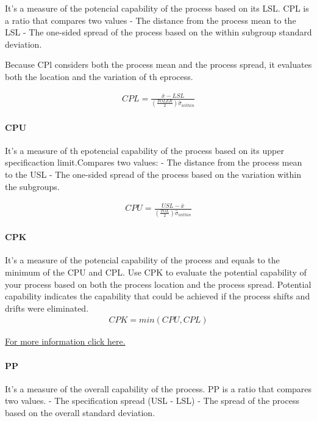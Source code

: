 \documentclass[11pt]{article}
\begin{document}
It's a measure of the potencial capability of the process based on its
LSL. CPL is a ratio that compares two values - The distance from the
process mean to the LSL - The one-sided spread of the process based on
the within subgroup standard deviation.

Because CPl considers both the process mean and the process spread, it
evaluates both the location and the variation of th eprocess.

\begin{gather}
  CPL = \frac{\bar{x} - LSL}{(\frac{TOLER}{2})\hat{\sigma}_{within}}
\end{gather}

\hypertarget{cpu}{%
\paragraph{CPU}\label{cpu}}

It's a measure of th epotencial capability of the process based on its
upper specificaction limit.Compares two values: - The distance from the
process mean to the USL - The one-sided spread of the process based on
the variation within the subgroups.

\begin{gather}
  CPU = \frac{USL - \bar{x} }{(\frac{TOL}{2})\hat{\sigma}_{within}}
\end{gather}

\hypertarget{cpk}{%
\paragraph{CPK}\label{cpk}}

It's a measure of the potencial capability of the process and equals to
the minimum of the CPU and CPL. Use CPK to evaluate the potential
capability of your process based on both the process location and the
process spread. Potential capability indicates the capability that could
be achieved if the process shifts and drifts were eliminated.
\begin{gather}
  CPK = min(CPU, CPL)
\end{gather}

\href{https://www.six-sigma-material.com/Cpk.html}{For more information click here.}

\hypertarget{pp}{%
\paragraph{PP}\label{pp}}

It's a measure of the overall capability of the process. PP is a ratio
that compares two values. - The specification spread (USL - LSL) - The
spread of the process based on the overall standard deviation.
\end{document}
